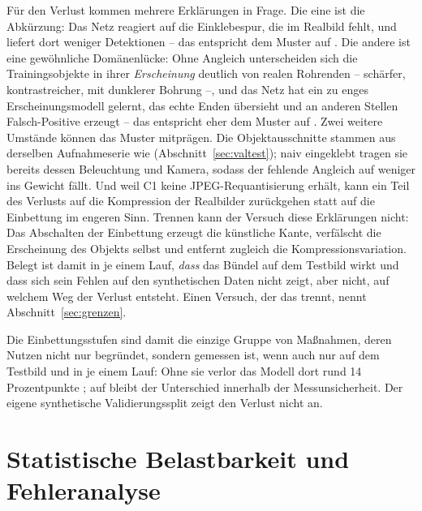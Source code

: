 Für den Verlust kommen mehrere Erklärungen in Frage. Die eine ist die Abkürzung:
Das Netz reagiert auf die Einklebespur, die im Realbild fehlt, und liefert dort
weniger Detektionen -- das entspricht dem Muster auf . Die andere ist eine
gewöhnliche Domänenlücke: Ohne Angleich unterscheiden sich die Trainingsobjekte
in ihrer \emph{Erscheinung} deutlich von realen Rohrenden -- schärfer,
kontrastreicher, mit dunklerer Bohrung --, und das Netz hat ein zu enges
Erscheinungsmodell gelernt, das echte Enden übersieht und an anderen Stellen
Falsch-Positive erzeugt -- das entspricht
eher dem Muster auf . Zwei weitere Umstände können das Muster
mitprägen. Die Objektausschnitte stammen aus derselben Aufnahmeserie wie
 (Abschnitt~\ref{sec:valtest}); naiv eingeklebt tragen sie bereits
dessen Beleuchtung und Kamera, sodass der fehlende Angleich auf 
weniger ins Gewicht fällt. Und weil C1 keine JPEG-Requantisierung erhält, kann ein Teil des
Verlusts auf die Kompression der Realbilder zurückgehen statt auf die
Einbettung im engeren Sinn. Trennen kann der Versuch diese Erklärungen nicht:
Das Abschalten der Einbettung erzeugt die künstliche Kante, verfälscht die
Erscheinung des Objekts selbst und entfernt zugleich die
Kompressionsvariation. Belegt ist damit in je einem Lauf, \emph{dass} das Bündel auf dem Testbild
wirkt und dass sich sein Fehlen auf den synthetischen Daten nicht zeigt, aber
nicht, auf welchem Weg der Verlust entsteht. Einen Versuch, der das trennt,
nennt Abschnitt~\ref{sec:grenzen}.

 Die Einbettungsstufen sind damit die
einzige Gruppe von Maßnahmen, deren Nutzen nicht nur begründet, sondern
gemessen ist, wenn auch nur auf dem Testbild und in je einem Lauf: Ohne sie
verlor das Modell dort rund 14 Prozentpunkte \mAPfifty; auf  bleibt
der Unterschied innerhalb der Messunsicherheit. Der eigene synthetische
Validierungssplit zeigt den Verlust nicht an.

\section{Statistische Belastbarkeit und Fehleranalyse}
\label{sec:bootstrap}

